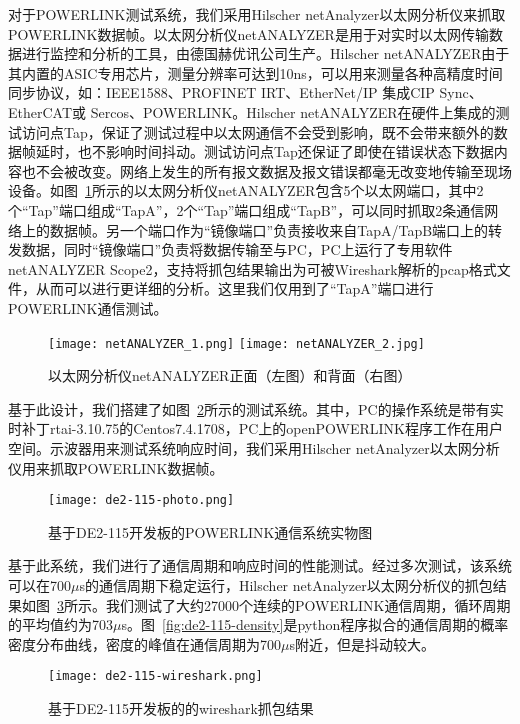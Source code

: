 对于POWERLINK测试系统，我们采用Hilscher netAnalyzer以太网分析仪来抓取POWERLINK数据帧。以太网分析仪netANALYZER是用于对实时以太网传输数据进行监控和分析的工具，由德国赫优讯公司生产。Hilscher netANALYZER由于其内置的ASIC专用芯片，测量分辨率可达到10ns，可以用来测量各种高精度时间同步协议，如：IEEE1588、PROFINET IRT、EtherNet/IP 集成CIP Sync、EtherCAT或 Sercos、POWERLINK。Hilscher netANALYZER在硬件上集成的测试访问点Tap，保证了测试过程中以太网通信不会受到影响，既不会带来额外的数据帧延时，也不影响时间抖动。测试访问点Tap还保证了即使在错误状态下数据内容也不会被改变。网络上发生的所有报文数据及报文错误都毫无改变地传输至现场设备。如图~\ref{fig:netANALYZER-photo}所示的以太网分析仪netANALYZER包含5个以太网端口，其中2个“Tap”端口组成“TapA”，2个“Tap”端口组成“TapB”，可以同时抓取2条通信网络上的数据帧。另一个端口作为“镜像端口”负责接收来自TapA/TapB端口上的转发数据，同时“镜像端口”负责将数据传输至与PC，PC上运行了专用软件netANALYZER Scope2，支持将抓包结果输出为可被Wireshark解析的pcap格式文件，从而可以进行更详细的分析。这里我们仅用到了“TapA”端口进行POWERLINK通信测试。

\begin{figure}[htb]\centering
  \texttt{[image: netANALYZER\_1.png]}  
  \texttt{[image: netANALYZER\_2.jpg]}
  \caption{以太网分析仪netANALYZER正面（左图）和背面（右图）}
  \label{fig:netANALYZER-photo}
\end{figure}


基于此设计，我们搭建了如图~\ref{fig:de2-115-photo}所示的测试系统。其中，PC的操作系统是带有实时补丁rtai-3.10.75的Centos7.4.1708，PC上的openPOWERLINK程序工作在用户空间。示波器用来测试系统响应时间，我们采用Hilscher netAnalyzer以太网分析仪用来抓取POWERLINK数据帧。
\begin{figure}[!htb]
  \centering
  \texttt{[image: de2-115-photo.png]}
  \caption{基于DE2-115开发板的POWERLINK通信系统实物图}
  \label{fig:de2-115-photo}
\end{figure}

基于此系统，我们进行了通信周期和响应时间的性能测试。经过多次测试，该系统可以在700$\mu$s的通信周期下稳定运行，Hilscher netAnalyzer以太网分析仪的抓包结果如图~\ref{fig:de2-115-wireshark}所示。我们测试了大约27000个连续的POWERLINK通信周期，循环周期的平均值约为703$\mu$s。图~\ref{fig:de2-115-density}是python程序拟合的通信周期的概率密度分布曲线，密度的峰值在通信周期为700$\mu$s附近，但是抖动较大。

\begin{figure}[!htb]
  \centering
  \texttt{[image: de2-115-wireshark.png]}
  \caption{基于DE2-115开发板的的wireshark抓包结果}
  \label{fig:de2-115-wireshark}
\end{figure}

